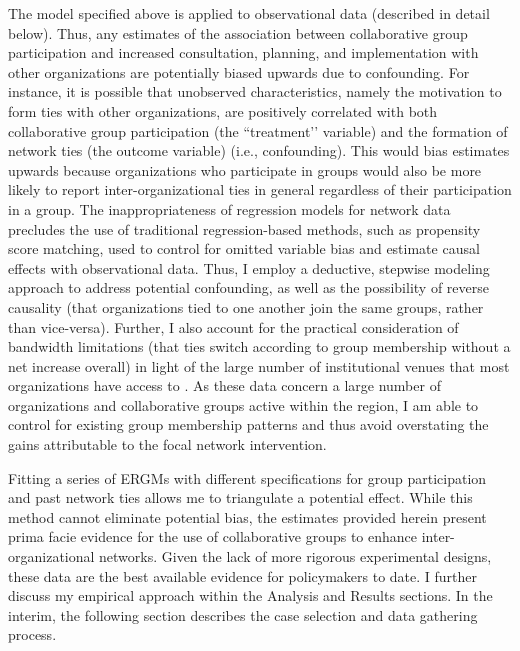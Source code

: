 \documentclass[12pt,a4paper,titlepage]{article}
\begin{document}
The model specified above is applied to observational data (described in detail below). Thus, any estimates of the association between collaborative group participation and increased consultation, planning, and implementation with other organizations are potentially biased upwards due to confounding. For instance, it is possible that unobserved characteristics, namely the motivation to form ties with other organizations, are positively correlated with both collaborative group participation (the ``treatment’’ variable) and the formation of network ties (the outcome variable) (i.e., confounding). This would bias estimates upwards because organizations who participate in groups would also be more likely to report inter-organizational ties in general regardless of their participation in a group. The inappropriateness of regression models for network data \parencite{kolaczyk2009,krackhardt1988} precludes the use of traditional regression-based methods, such as propensity score matching, used to control for omitted variable bias and estimate causal effects with observational data. Thus, I employ a deductive, stepwise modeling approach to address potential confounding, as well as the possibility of reverse causality (that organizations tied to one another join the same groups, rather than vice-versa). Further, I also account for the practical consideration of bandwidth limitations (that ties switch according to group membership without a net increase overall) in light of the large number of institutional venues that most organizations have access to \parencite{berardo2010,lubell2010,lubell2011-a,mcallister2014, smaldino2014,niles2012, gerlak2012}. As these data concern a large number of organizations and collaborative groups active within the region, I am able to control for existing group membership patterns and thus avoid overstating the gains attributable to the focal network intervention.

Fitting a series of ERGMs with different specifications for group participation and past network ties allows me to triangulate a potential effect. While this method cannot eliminate potential bias, the estimates provided herein present prima facie evidence for the use of collaborative groups to enhance inter-organizational networks. Given the lack of more rigorous experimental designs, these data are the best available evidence for policymakers to date. I further discuss my empirical approach within the Analysis and Results sections. In the interim, the following section describes the case selection and data gathering process.
\end{document}
